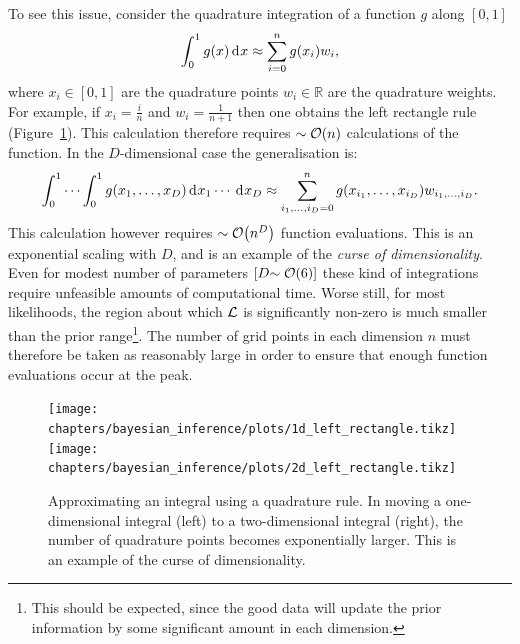 To see this issue, consider the quadrature integration of a function \(g\) along \([0,1]\)
\begin{equation}
  \int_0^1 g(x) \operatorname{d}^{}\!{x} \approx \sum\limits_{i=0}^{n} g(x_i) w_i,
  \label{eqn:bay:quadrature_1d}
\end{equation}
where \({x_i\in[0,1]}\) are the quadrature points \({w_i\in\mathbb{R}}\) are the quadrature weights. For example, if \(x_i = \frac{i}{n}\) and \(w_i=\frac{1}{n+1}\) then one obtains the left rectangle rule (Figure~\ref{fig:bay:quadrature}). This calculation therefore requires \({\sim\mathcal{O}{\left(n\right)}}\) calculations of the function. In the \(D\)-dimensional case the generalisation is:
\begin{equation}
  \int_0^1\cdots\int_0^1 g(x_1,\ldots,x_D) \operatorname{d}^{}\!{x_1}\cdots \: \operatorname{d}^{}\!{x_D} \approx \sum\limits_{i_1,\ldots,i_D=0}^{n} g(x_{i_1},\ldots,x_{i_D}) w_{i_1,\ldots,i_D}.
  \label{eqn:bay:quadrature_nd}
\end{equation}
This calculation however requires \({\sim\mathcal{O}{\left(n^D\right)}}\) function evaluations. This is an exponential scaling with \(D\), and is an example of the {\em curse of dimensionality}. Even for modest number of parameters \(\left[ D{\sim\mathcal{O}{\left(6\right)}} \right]\) these kind of integrations require unfeasible amounts of computational time. Worse still, for most likelihoods, the region about which \(\mathcal{L}\) is significantly non-zero is much smaller than the prior range\footnote{This should be expected, since the good data will update the prior information by some significant amount in each dimension.}. The number of grid points in each dimension \(n\) must therefore be taken as reasonably large in order to ensure that enough function evaluations occur at the peak.

\begin{figure}[tp]
  \centering
    \texttt{[image: chapters/bayesian\_inference/plots/1d\_left\_rectangle.tikz]}
    \texttt{[image: chapters/bayesian\_inference/plots/2d\_left\_rectangle.tikz]}
  \caption{Approximating an integral using a quadrature rule. In moving a one-dimensional integral (left) to a two-dimensional integral (right), the number of quadrature points becomes exponentially larger. This is an example of the curse of dimensionality.}\label{fig:bay:quadrature}
\end{figure}

